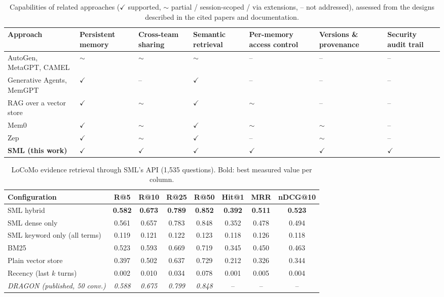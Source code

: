 \documentclass[11pt,a4paper]{article}
\theoremstyle{remark}
\newcommand{\sys}{SML}
\newcommand{\best}[1]{\textbf{#1}}
\begin{document}
\begin{table}[htbp]
\centering
\small
\caption{Capabilities of related approaches ($\checkmark$ supported, $\sim$ partial / session-scoped / via extensions,
-- not addressed), assessed from the designs described in the cited papers and documentation.}
\label{tab:related}
\begin{tabularx}{\textwidth}{@{}>{\raggedright\arraybackslash}p{4.3cm}*{6}{>{\centering\arraybackslash}X}@{}}
\toprule
Approach & Persistent memory & Cross-team sharing & Semantic retrieval & Per-memory access control & Versions \& provenance & Security audit trail \\
\midrule
AutoGen, MetaGPT, CAMEL & $\sim$ & $\sim$ & $\sim$ & -- & -- & -- \\
Generative Agents, MemGPT & $\checkmark$ & -- & $\checkmark$ & -- & -- & -- \\
RAG over a vector store & $\checkmark$ & $\sim$ & $\checkmark$ & $\sim$ & -- & -- \\
Mem0 & $\checkmark$ & $\sim$ & $\checkmark$ & $\sim$ & $\sim$ & -- \\
Zep & $\checkmark$ & $\sim$ & $\checkmark$ & -- & $\sim$ & -- \\
\midrule
\textbf{\sys{} (this work)} & $\checkmark$ & $\checkmark$ & $\checkmark$ & $\checkmark$ & $\checkmark$ & $\checkmark$ \\
\bottomrule
\end{tabularx}
\end{table}

\begin{table}[htbp]
\centering
\small
\caption{LoCoMo evidence retrieval through \sys{}'s API (1{,}535 questions). Bold: best measured value per column.}
\label{tab:locomo}
\begin{tabular}{@{}lccccccc@{}}
\toprule
Configuration & R@5 & R@10 & R@25 & R@50 & Hit@1 & MRR & nDCG@10 \\
\midrule
\sys{} hybrid & \best{0.582} & \best{0.673} & \best{0.789} & \best{0.852} & \best{0.392} & \best{0.511} & \best{0.523} \\
\sys{} dense only & 0.561 & 0.657 & 0.783 & 0.848 & 0.352 & 0.478 & 0.494 \\
\sys{} keyword only (all terms) & 0.119 & 0.121 & 0.122 & 0.123 & 0.118 & 0.126 & 0.118 \\
BM25 & 0.523 & 0.593 & 0.669 & 0.719 & 0.345 & 0.450 & 0.463 \\
Plain vector store & 0.397 & 0.502 & 0.637 & 0.729 & 0.212 & 0.326 & 0.344 \\
Recency (last $k$ turns) & 0.002 & 0.010 & 0.034 & 0.078 & 0.001 & 0.005 & 0.004 \\
\midrule
\textit{DRAGON (published, 50 conv.)} & \textit{0.588} & \textit{0.675} & \textit{0.799} & \textit{0.848} & -- & -- & -- \\
\bottomrule
\end{tabular}
\end{table}
\end{document}
